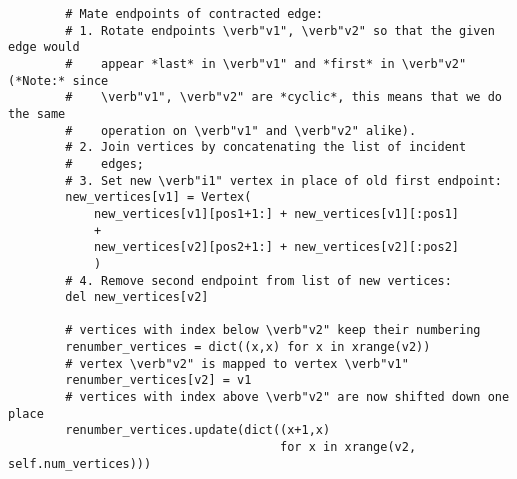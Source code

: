 \begin{lstlisting}
        # Mate endpoints of contracted edge:
        # 1. Rotate endpoints \verb"v1", \verb"v2" so that the given edge would
        #    appear *last* in \verb"v1" and *first* in \verb"v2" (*Note:* since
        #    \verb"v1", \verb"v2" are *cyclic*, this means that we do the same
        #    operation on \verb"v1" and \verb"v2" alike).
        # 2. Join vertices by concatenating the list of incident
        #    edges;
        # 3. Set new \verb"i1" vertex in place of old first endpoint:
        new_vertices[v1] = Vertex(
            new_vertices[v1][pos1+1:] + new_vertices[v1][:pos1]
            +
            new_vertices[v2][pos2+1:] + new_vertices[v2][:pos2]
            )
        # 4. Remove second endpoint from list of new vertices:
        del new_vertices[v2]

        # vertices with index below \verb"v2" keep their numbering
        renumber_vertices = dict((x,x) for x in xrange(v2))
        # vertex \verb"v2" is mapped to vertex \verb"v1"
        renumber_vertices[v2] = v1
        # vertices with index above \verb"v2" are now shifted down one place
        renumber_vertices.update(dict((x+1,x)
                                      for x in xrange(v2, self.num_vertices)))
        

\end{lstlisting}
